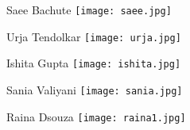 \documentclass{beamer}
\begin{document}
\begin{frame}{Saee Bachute}
    \centering
    \texttt{[image: saee.jpg]}
\end{frame}

\begin{frame}{Urja Tendolkar}
    \centering
    \texttt{[image: urja.jpg]}
\end{frame}

\begin{frame}{Ishita Gupta}
    \centering
    \texttt{[image: ishita.jpg]}
\end{frame}

\begin{frame}{Sania Valiyani}
    \centering
    \texttt{[image: sania.jpg]}
\end{frame}

\begin{frame}{Raina Dsouza}
    \centering
    \texttt{[image: raina1.jpg]}
\end{frame}
\end{document}
